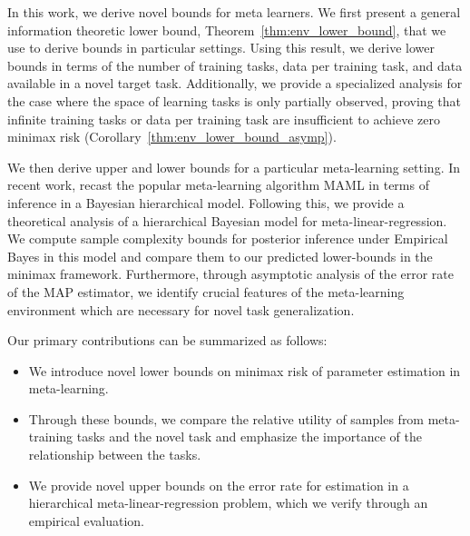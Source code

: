 In this work, we derive novel bounds for meta learners. We first present a general information theoretic lower bound, Theorem~\ref{thm:env_lower_bound}, that we use to derive bounds in particular settings. Using this result, we derive lower bounds in terms of the number of training tasks, data per training task, and data available in a novel target task. Additionally, we provide a specialized analysis for the case where the space of learning tasks is only partially observed, proving that infinite training tasks or data per training task are insufficient to achieve zero minimax risk (Corollary~\ref{thm:env_lower_bound_asymp}).

We then derive upper and lower bounds for a particular meta-learning setting. In recent work, \citet{grant2018recasting} recast the popular meta-learning algorithm MAML \citep{finn2017model} in terms of inference in a Bayesian hierarchical model. Following this, we provide a theoretical analysis of a hierarchical Bayesian model for meta-linear-regression. We compute sample complexity bounds for posterior inference under Empirical Bayes \citep{robbins1956} in this model and compare them to our predicted lower-bounds in the minimax framework.  Furthermore, through asymptotic analysis of the error rate of the MAP estimator, we identify crucial features of the meta-learning environment which are necessary for novel task generalization.

Our primary contributions can be summarized as follows:
\begin{itemize}
    \item We introduce novel lower bounds on minimax risk of parameter estimation in meta-learning.
    \item Through these bounds, we compare the relative utility of samples from meta-training tasks and the novel task and emphasize the importance of the relationship between the tasks.
    \item We provide novel upper bounds on the error rate for estimation in a hierarchical meta-linear-regression problem, which we verify through an empirical evaluation.
\end{itemize}

